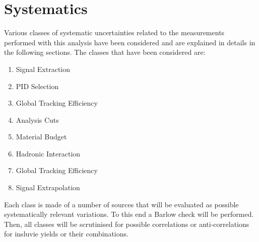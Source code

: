 \section{Systematics}
\label{sec:Systematics}
Various classes of systematic uncertainties related to the measurements performed with this analysis have been considered and are explained in details in the following sections. The classes that have been considered are:
\begin{enumerate}
\item Signal Extraction
\item PID Selection
\item	Global Tracking Efficiency
\item	Analysis Cuts
\item Material Budget
\item Hadronic Interaction
\item	Global Tracking Efficiency
\item	Signal Extrapolation
\end{enumerate}
Each class is made of a number of sources that will be evaluated as possible systematically relevant variations. To this end a Barlow check will be performed. Then, all classes will be scrutinised for possible correlations or anti-correlations for insluvie yields or their combinations.

